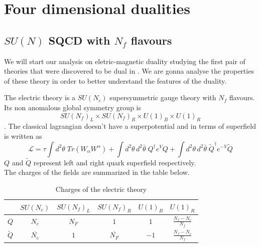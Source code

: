 \chapter{Four dimensional dualities}




\section{$SU(N)$ SQCD with $N_f$ flavours }

We will start our analysis on eletric-magnetic duality studying the first pair of theories that were discovered to be dual in \cite{Seiberg:1994pq}.  
We are gonna analyse the properties of these theory in order to better understand the features of the duality.



The electric theory is a $SU(N_c) $ supersymmetric gauge theory with $N_f$ flavours.
Its non anomalous global symmetry group is 
$$
SU(N_f)_L \times SU(N_f)_R \times U(1)_B \times U(1)_R 
\label{eqn:seib_dual_global_symm_group}
$$. 
The classical lagrangian doesn't have a superpotential and in terms of superfield is written as
\begin{equation}
 \mathcal{L} = \tau \int d^2 \theta \; Tr ( W_{\alpha} W^{\alpha} ) + 
 \int d^2 \theta \, d^2 \bar{\theta} \;  {Q}^{\dagger} e^{ V} Q +
 \int d^2 \theta \, d^2 \bar{\theta} \; {\tilde{Q}^{\dagger}} e^{- V} \tilde{Q}
 \end{equation} 
$Q$ and $\tilde{Q}$ represent left and right quark superfield respectively.\\
The charges of the fields are summarized in the table below.
\begin{table}[h!]
 \begin{tabular}{c | c |  c c c c }
 & $SU(N_c) $& $SU(N_f)_L$  &$SU(N_f)_R $  & $U(1)_B$ &  $U(1)_R$ \\
\hline
$Q$ & $N_c$ & $N_F$ & $1$   &  $1$  & $ \frac{N_f - N_c}{N_f}$  \\
$\tilde{Q}$ &$\overline{N_c} $ &  $1$ & $\overline{ N_F}$   & $-1$   &  $\frac{N_f - N_c}{N_f}$   \\	 
 \end{tabular}
	\centering
 \caption{Charges of the electric theory}
\end{table}

